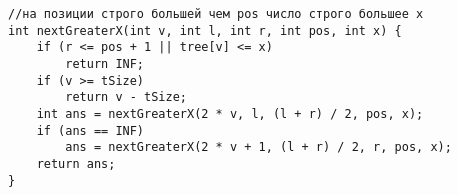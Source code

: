\begin{verbatim}
//на позиции строго большей чем pos число строго большее x
int nextGreaterX(int v, int l, int r, int pos, int x) {
	if (r <= pos + 1 || tree[v] <= x)
		return INF;
	if (v >= tSize)
		return v - tSize;
	int ans = nextGreaterX(2 * v, l, (l + r) / 2, pos, x);
	if (ans == INF)
		ans = nextGreaterX(2 * v + 1, (l + r) / 2, r, pos, x);
	return ans;
}
\end{verbatim}
